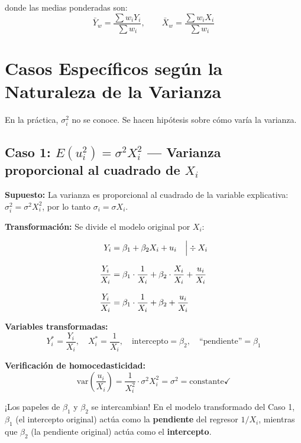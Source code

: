 \documentclass[12pt,a4paper]{article}
\begin{document}
donde las medias ponderadas son:
\begin{equation}
\bar{Y}_w = \frac{\sum w_i Y_i}{\sum w_i}, \qquad \bar{X}_w = \frac{\sum w_i X_i}{\sum w_i}
\end{equation}

\section{Casos Específicos según la Naturaleza de la Varianza}

En la práctica, $\sigma_i^2$ no se conoce. Se hacen hipótesis sobre cómo varía la varianza.

\subsection{Caso 1: $E(u_i^2) = \sigma^2 X_i^2$ --- Varianza proporcional al cuadrado de $X_i$}

\textbf{Supuesto:} La varianza es proporcional al cuadrado de la variable explicativa: $\sigma_i^2 = \sigma^2 X_i^2$, por lo tanto $\sigma_i = \sigma X_i$.

\textbf{Transformación:} Se divide el modelo original por $X_i$:

\begin{align}
Y_i &= \beta_1 + \beta_2 X_i + u_i \quad \Big| \div X_i \notag \\[8pt]
\frac{Y_i}{X_i} &= \beta_1 \cdot \frac{1}{X_i} + \beta_2 \cdot \frac{X_i}{X_i} + \frac{u_i}{X_i} \\[8pt]
\frac{Y_i}{X_i} &= \beta_1 \cdot \frac{1}{X_i} + \beta_2 + \frac{u_i}{X_i}
\end{align}

\textbf{Variables transformadas:}
\begin{equation}
Y_i^* = \frac{Y_i}{X_i}, \quad X_i^* = \frac{1}{X_i}, \quad \text{intercepto} = \beta_2, \quad \text{``pendiente''} = \beta_1
\end{equation}

\textbf{Verificación de homocedasticidad:}
\begin{equation}
\text{var}\left(\frac{u_i}{X_i}\right) = \frac{1}{X_i^2} \cdot \sigma^2 X_i^2 = \sigma^2 = \text{constante} \checkmark
\end{equation}

\begin{advertencia}{¡Los papeles de $\beta_1$ y $\beta_2$ se intercambian!}
En el modelo transformado del Caso 1, $\beta_1$ (el intercepto original) actúa como la \textbf{pendiente} del regresor $1/X_i$, mientras que $\beta_2$ (la pendiente original) actúa como el \textbf{intercepto}.
\end{advertencia}
\end{document}
